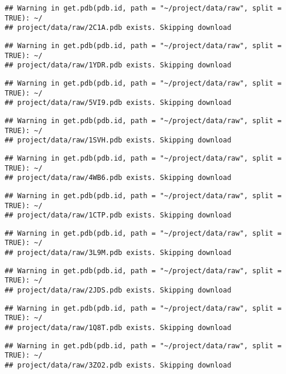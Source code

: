 \documentclass[
]{article}
\begin{document}
\begin{verbatim}
## Warning in get.pdb(pdb.id, path = "~/project/data/raw", split = TRUE): ~/
## project/data/raw/2C1A.pdb exists. Skipping download
\end{verbatim}

\begin{verbatim}
## Warning in get.pdb(pdb.id, path = "~/project/data/raw", split = TRUE): ~/
## project/data/raw/1YDR.pdb exists. Skipping download
\end{verbatim}

\begin{verbatim}
## Warning in get.pdb(pdb.id, path = "~/project/data/raw", split = TRUE): ~/
## project/data/raw/5VI9.pdb exists. Skipping download
\end{verbatim}

\begin{verbatim}
## Warning in get.pdb(pdb.id, path = "~/project/data/raw", split = TRUE): ~/
## project/data/raw/1SVH.pdb exists. Skipping download
\end{verbatim}

\begin{verbatim}
## Warning in get.pdb(pdb.id, path = "~/project/data/raw", split = TRUE): ~/
## project/data/raw/4WB6.pdb exists. Skipping download
\end{verbatim}

\begin{verbatim}
## Warning in get.pdb(pdb.id, path = "~/project/data/raw", split = TRUE): ~/
## project/data/raw/1CTP.pdb exists. Skipping download
\end{verbatim}

\begin{verbatim}
## Warning in get.pdb(pdb.id, path = "~/project/data/raw", split = TRUE): ~/
## project/data/raw/3L9M.pdb exists. Skipping download
\end{verbatim}

\begin{verbatim}
## Warning in get.pdb(pdb.id, path = "~/project/data/raw", split = TRUE): ~/
## project/data/raw/2JDS.pdb exists. Skipping download
\end{verbatim}

\begin{verbatim}
## Warning in get.pdb(pdb.id, path = "~/project/data/raw", split = TRUE): ~/
## project/data/raw/1Q8T.pdb exists. Skipping download
\end{verbatim}

\begin{verbatim}
## Warning in get.pdb(pdb.id, path = "~/project/data/raw", split = TRUE): ~/
## project/data/raw/3ZO2.pdb exists. Skipping download
\end{verbatim}
\end{document}

